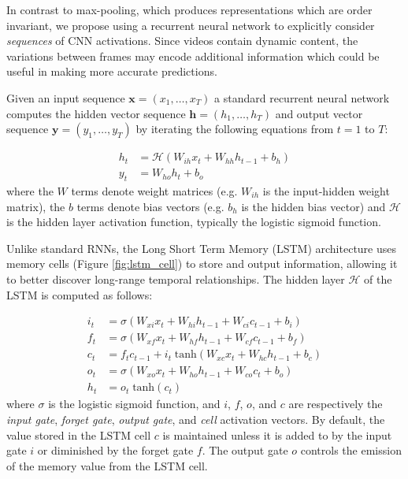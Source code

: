 \documentclass[10pt,twocolumn,letterpaper]{article}
\begin{document}
In contrast to max-pooling, which produces representations which are order
invariant, we propose using a recurrent neural network to explicitly consider
\textit{sequences} of CNN activations. Since videos contain dynamic content,
the variations between frames may encode additional information which could be
useful in making more accurate predictions.

Given an input sequence $\textbf{x} = (x_1,\dotsc,x_T)$ a standard recurrent
neural network computes the hidden vector sequence $\textbf{h} =
(h_1,\dotsc,h_T)$ and output vector sequence $\textbf{y} =
(y_1,\dotsc,y_T)$ by iterating the following equations from $t = 1$ to
$T$:

\begin{align}
  h_t &= \mathcal{H}(W_{ih}x_t + W_{hh}h_{t-1} + b_h) \\
  y_t &= W_{ho}h_t + b_o
\end{align}\noindent where the $W$ terms denote weight matrices (e.g. $W_{ih}$ is the
input-hidden weight matrix), the $b$ terms denote bias vectors
(e.g. $b_h$ is the hidden bias vector) and $\mathcal{H}$ is the hidden
layer activation function, typically the logistic sigmoid function.

Unlike standard RNNs, the Long Short Term Memory (LSTM) architecture
\cite{gers02learning} uses memory cells (Figure \ref{fig:lstm_cell})
to store and output information, allowing it to better discover long-range
temporal relationships. The hidden layer $\mathcal{H}$ of the
LSTM is computed as follows:

\begin{align}
i_t &= \sigma (W_{xi}x_t + W_{hi}h_{t-1} + W_{ci}c_{t-1} + b_i) \label{eqi}\\
f_t &= \sigma (W_{xf}x_t + W_{hf}h_{t-1} + W_{cf}c_{t-1} + b_f) \label{eqf}\\
c_t &= f_tc_{t-1} + i_t\;\textrm{tanh}(W_{xc}x_t + W_{hc}h_{t-1} + b_c) \label{eqc}\\
o_t &= \sigma (W_{xo}x_t + W_{ho}h_{t-1} + W_{co}c_t + b_o) \label{eqo}\\
h_t &= o_t\;\textrm{tanh}(c_t) \label{eqh}
\end{align}\noindent where $\sigma$ is the logistic sigmoid function, and $i$, $f$, $o$,
and $c$ are respectively the \textit{input gate}, \textit{forget
  gate}, \textit{output gate}, and \textit{cell} activation
vectors. By default, the value stored in the LSTM cell $c$ is
maintained unless it is added to by the input gate $i$ or diminished
by the forget gate $f$. The output gate $o$ controls the emission of
the memory value from the LSTM cell.
\end{document}
